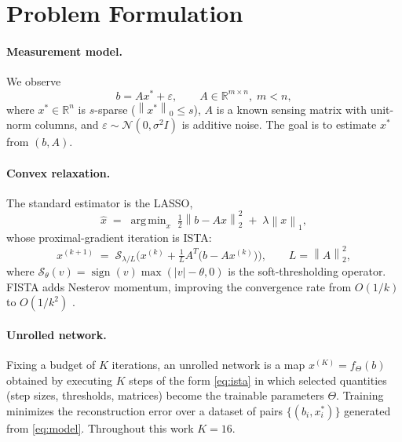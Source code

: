\documentclass[12pt,a4paper]{article}
\newcommand{\norm}[1]{\left\lVert #1 \right\rVert}
\newcommand{\R}{\mathbb{R}}
\newcommand{\st}{\mathcal{S}}
\DeclareMathOperator*{\argmin}{arg\,min}
\begin{document}
\section{Problem Formulation}
\label{sec:problem}

\paragraph{Measurement model.} We observe
\begin{equation}
b = A x^{*} + \varepsilon, \qquad A \in \R^{m\times n},\; m < n,
\label{eq:model}
\end{equation}
where $x^{*}\in\R^{n}$ is $s$-sparse ($\norm{x^*}_0 \le s$), $A$ is a known sensing matrix with unit-norm columns, and $\varepsilon\sim\mathcal N(0,\sigma^2 I)$ is additive noise. The goal is to estimate $x^*$ from $(b, A)$.

\paragraph{Convex relaxation.} The standard estimator is the LASSO,
\begin{equation}
\hat{x} \;=\; \argmin_{x}\; \tfrac12 \norm{b - Ax}_2^2 \;+\; \lambda \norm{x}_1 ,
\label{eq:lasso}
\end{equation}
whose proximal-gradient iteration is ISTA:
\begin{equation}
x^{(k+1)} \;=\; \st_{\lambda/L}\!\Big( x^{(k)} + \tfrac1L A^{T}\big(b - A x^{(k)}\big) \Big),
\qquad L = \norm{A}_2^2,
\label{eq:ista}
\end{equation}
where $\st_{\theta}(v) = \operatorname{sign}(v)\max(|v|-\theta, 0)$ is the soft-thresholding operator. FISTA adds Nesterov momentum, improving the convergence rate from $O(1/k)$ to $O(1/k^2)$ \cite{beck2009fista}.

\paragraph{Unrolled network.} Fixing a budget of $K$ iterations, an unrolled network is a map $x^{(K)} = f_\Theta(b)$ obtained by executing $K$ steps of the form \eqref{eq:ista} in which selected quantities (step sizes, thresholds, matrices) become the trainable parameters $\Theta$. Training minimizes the reconstruction error over a dataset of pairs $\{(b_i, x^*_i)\}$ generated from \eqref{eq:model}. Throughout this work $K=16$.
\end{document}
